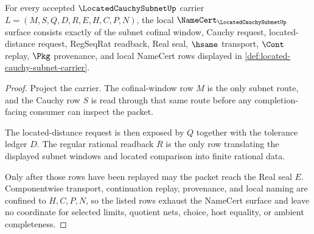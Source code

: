 \begin{theorem}
\label{thm:located-cauchy-subnet-namecert-obligations}
For every accepted $\LocatedCauchySubnetUp$ carrier $L=(M,S,Q,D,R,E,H,C,P,N)$, the local $\NameCert_{\LocatedCauchySubnetUp}$ surface consists exactly of the subnet cofinal window, Cauchy request, located-distance request, RegSeqRat readback, Real seal, $\hsame$ transport, $\Cont$ replay, $\Pkg$ provenance, and local NameCert rows displayed in \autoref{def:located-cauchy-subnet-carrier}.
\end{theorem}
\begin{proof}
Project the carrier. The cofinal-window row $M$ is the only subnet route, and the Cauchy row $S$ is read through that same route before any completion-facing consumer can inspect the packet.

The located-distance request is then exposed by $Q$ together with the tolerance ledger $D$. The regular rational readback $R$ is the only row translating the displayed subnet windows and located comparison into finite rational data.

Only after those rows have been replayed may the packet reach the Real seal $E$. Componentwise transport, continuation replay, provenance, and local naming are confined to $H,C,P,N$, so the listed rows exhaust the NameCert surface and leave no coordinate for selected limits, quotient nets, choice, host equality, or ambient completeness.
\end{proof}


\begin{closurestatus}{\LocatedCauchySubnetUp}
  \theoryclosure{\seedClosure}
  \formalstatus{\unformalizedV}
\end{closurestatus}
